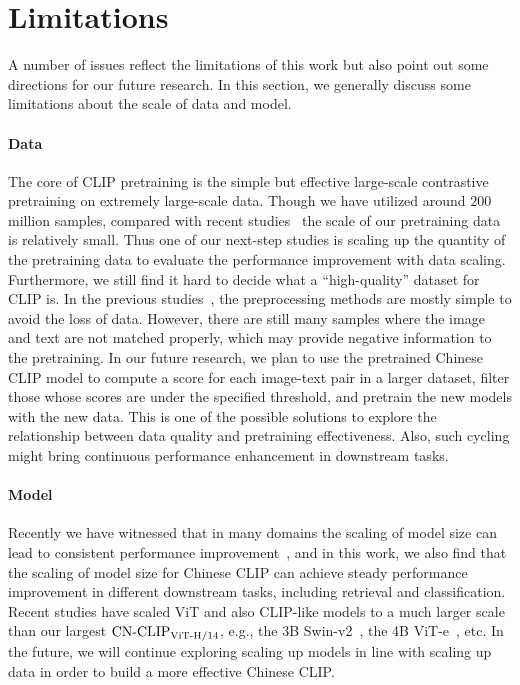 \documentclass[11pt]{article}
\begin{document}
\section*{Limitations}
A number of issues reflect the limitations of this work but also point out some directions for our future research. In this section, we generally discuss some limitations about the scale of data and model. 

\paragraph{Data} 
The core of CLIP pretraining is the simple but effective large-scale contrastive pretraining on extremely large-scale data. Though we have utilized around $200$ million samples, compared with recent studies~\citep{florence, pali} the scale of our pretraining data is relatively small. 
Thus one of our next-step studies is scaling up the quantity of the pretraining data to evaluate the performance improvement with data scaling. 
Furthermore, we still find it hard to decide what a ``high-quality'' dataset for CLIP is. 
In the previous studies~\citep{align, declip}, the preprocessing methods are mostly simple to avoid the loss of data. 
However, there are still many samples where the image and text are not matched properly, which may provide negative information to the pretraining. 
In our future research, we plan to use the pretrained Chinese CLIP model to compute a score for each image-text pair in a larger dataset, filter those whose scores are under the specified threshold, and pretrain the new models with the new data. 
This is one of the possible solutions to explore the relationship between data quality and pretraining effectiveness. 
Also, such cycling might bring continuous performance enhancement in downstream tasks. 

\paragraph{Model} 
Recently we have witnessed that in many domains the scaling of model size can lead to consistent performance improvement~\citep{scaling_laws,emergent}, and in this work, we also find that the scaling of model size for Chinese CLIP can achieve steady performance improvement in different downstream tasks, including retrieval and classification. 
Recent studies have scaled ViT and also CLIP-like models to a much larger scale than our largest $\text{CN-CLIP}\rm_{ViT\text{-}H/14}$, e.g., the 3B Swin-v2~\citep{swin-v2}, the 4B ViT-e~\citep{pali}, etc. 
In the future, we will continue exploring scaling up models in line with scaling up data in order to build a more effective Chinese CLIP. 
\end{document}
